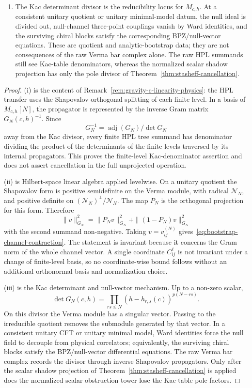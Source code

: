 \begin{theorem}
\begin{enumerate}[label=\textup{(\roman*)}]
 normalization.
\item The Kac determinant divisor is the reducibility locus for
 \(M_{c,h}\).  At a consistent unitary quotient or unitary
 minimal-model datum, the null ideal is divided out, null-channel
 three-point couplings vanish by Ward identities, and the surviving
 chiral blocks satisfy the corresponding BPZ/null-vector equations.
 These are quotient and analytic-bootstrap data; they are not
 consequences of the raw Verma bar complex alone.  The raw HPL
 summands still see Kac-table denominators, whereas the normalized
 scalar shadow projection has only the pole divisor of
 Theorem~\ref{thm:stasheff-cancellation}.
\end{enumerate}
\end{theorem}

\begin{proof}
(i) is the content of
Remark~\ref{rem:gravity-c-linearity-physics}: the HPL transfer
uses the Shapovalov orthogonal splitting of each finite level.
In a basis of \(M_{c,h}[N]\), the propagator is represented by
the inverse Gram matrix \(G_N(c,h)^{-1}\).  Since
\[
G_N^{-1}=\operatorname{adj}(G_N)/\det G_N
\]
away from the Kac divisor, every finite HPL tree summand has
denominator dividing the product of the determinants of the finite
levels traversed by its internal propagators.  This proves the
finite-level Kac-denominator assertion and does not assert
cancellation in the full unprojected operation.

(ii) is Hilbert-space linear algebra applied levelwise.  On a
unitary quotient the Shapovalov form is positive semidefinite on
the Verma module, with radical \(\mathcal N_N\), and positive
definite on \((\mathcal N_N)^\perp/\mathcal N_N\).  The map \(P_N\)
is the orthogonal projection for this form. Therefore
\[
\|v\|_{G_N}^2
=\|P_Nv\|_{G_N}^2+\|(1-P_N)v\|_{G_N}^2
\]
with the second summand non-negative.  Taking
\(v=v_{ij}^{(N)}\) gives~\eqref{eq:bootstrap-channel-contraction}.
The statement is invariant because it concerns the Gram norm of the
whole channel vector.  A single coordinate \(C^\ell_{ij}\) is not
invariant under a change of finite-level basis, so no coordinate-wise
bound follows without an additional orthonormal basis and normalization
choice.

(iii) is the Kac determinant and null-vector mechanism.  Up to a
non-zero scalar,
\[
\det G_N(c,h)=
\prod_{rs\le N}(h-h_{r,s}(c))^{p(N-rs)} .
\]
On this divisor the Verma module has a singular vector.  Passing to
the irreducible quotient removes the submodule generated by that
vector.  In a consistent unitary CFT or unitary minimal model,
Ward identities force the null field to decouple from physical
correlators; equivalently, the surviving chiral blocks satisfy the
BPZ/null-vector differential equations.  The raw Verma bar complex
records the divisor through inverse Shapovalov propagators.  Only
after the scalar shadow projection of
Theorem~\ref{thm:stasheff-cancellation} is applied does the normalized
scalar obstruction tower lose the Kac-table pole factors.
\end{proof}

